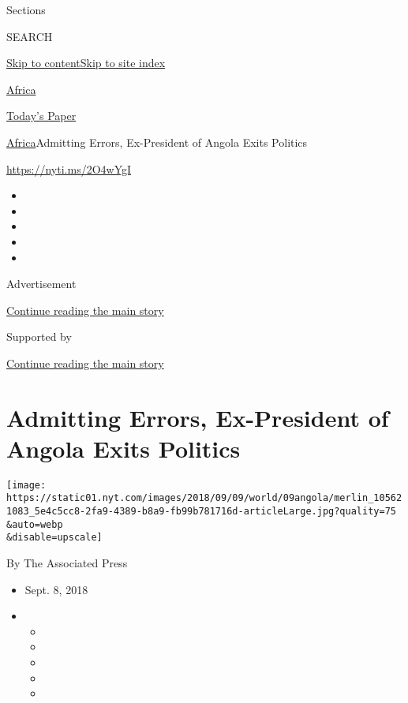 Sections

SEARCH

\protect\hyperlink{site-content}{Skip to
content}\protect\hyperlink{site-index}{Skip to site index}

\href{https://www.nytimes.com/section/world/africa}{Africa}

\href{https://myaccount.nytimes.com/auth/login?response_type=cookie\&client_id=vi}{}

\href{https://www.nytimes.com/section/todayspaper}{Today's Paper}

\href{/section/world/africa}{Africa}\textbar{}Admitting Errors,
Ex-President of Angola Exits Politics

\url{https://nyti.ms/2O4wYgI}

\begin{itemize}
\item
\item
\item
\item
\item
\end{itemize}

Advertisement

\protect\hyperlink{after-top}{Continue reading the main story}

Supported by

\protect\hyperlink{after-sponsor}{Continue reading the main story}

\hypertarget{admitting-errors-ex-president-of-angola-exits-politics}{%
\section{Admitting Errors, Ex-President of Angola Exits
Politics}\label{admitting-errors-ex-president-of-angola-exits-politics}}

\texttt{[image: https://static01.nyt.com/images/2018/09/09/world/09angola/merlin\_105621083\_5e4c5cc8-2fa9-4389-b8a9-fb99b781716d-articleLarge.jpg?quality=75\\\&auto=webp\\\&disable=upscale]}

By The Associated Press

\begin{itemize}
\item
  Sept. 8, 2018
\item
  \begin{itemize}
  \item
  \item
  \item
  \item
  \item
  \end{itemize}
\end{itemize}

